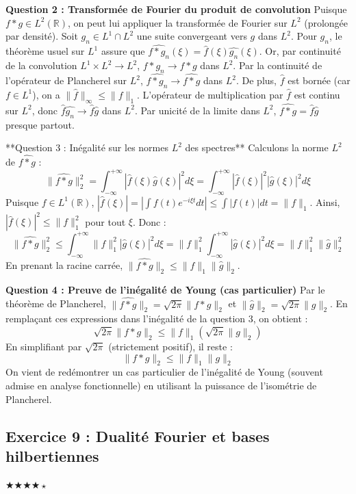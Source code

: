 \documentclass[11pt,a4paper]{article}
\begin{document}
\textbf{Question 2 : Transformée de Fourier du produit de convolution}
Puisque $f * g \in L^2(\mathbb{R})$, on peut lui appliquer la transformée de Fourier sur $L^2$ (prolongée par densité).
Soit $g_n \in L^1 \cap L^2$ une suite convergeant vers $g$ dans $L^2$.
Pour $g_n$, le théorème usuel sur $L^1$ assure que $\widehat{f * g_n}(\xi) = \hat{f}(\xi)\hat{g_n}(\xi)$.
Or, par continuité de la convolution $L^1 \times L^2 \to L^2$, $f * g_n \to f * g$ dans $L^2$.
Par la continuité de l'opérateur de Plancherel sur $L^2$, $\widehat{f * g_n} \to \widehat{f * g}$ dans $L^2$.
De plus, $\hat{f}$ est bornée (car $f \in L^1$), on a $\|\hat{f}\|_{\infty} \le \|f\|_1$.
L'opérateur de multiplication par $\hat{f}$ est continu sur $L^2$, donc $\hat{f} \hat{g_n} \to \hat{f} \hat{g}$ dans $L^2$.
Par unicité de la limite dans $L^2$, $\widehat{f * g} = \hat{f}\hat{g}$ presque partout.

**Question 3 : Inégalité sur les normes $L^2$ des spectres**
Calculons la norme $L^2$ de $\widehat{f * g}$ :
$$ \|\widehat{f * g}\|_2^2 = \int_{-\infty}^{+\infty} |\hat{f}(\xi)\hat{g}(\xi)|^2 d\xi = \int_{-\infty}^{+\infty} |\hat{f}(\xi)|^2 |\hat{g}(\xi)|^2 d\xi $$
Puisque $f \in L^1(\mathbb{R})$, $|\hat{f}(\xi)| = |\int f(t)e^{-i\xi t}dt| \le \int |f(t)|dt = \|f\|_1$.
Ainsi, $|\hat{f}(\xi)|^2 \le \|f\|_1^2$ pour tout $\xi$.
Donc :
$$ \|\widehat{f * g}\|_2^2 \le \int_{-\infty}^{+\infty} \|f\|_1^2 |\hat{g}(\xi)|^2 d\xi = \|f\|_1^2 \int_{-\infty}^{+\infty} |\hat{g}(\xi)|^2 d\xi = \|f\|_1^2 \|\hat{g}\|_2^2 $$
En prenant la racine carrée, $\|\widehat{f * g}\|_2 \le \|f\|_1 \|\hat{g}\|_2$.

\textbf{Question 4 : Preuve de l'inégalité de Young (cas particulier)}
Par le théorème de Plancherel, $\|\widehat{f * g}\|_2 = \sqrt{2\pi} \|f * g\|_2$ et $\|\hat{g}\|_2 = \sqrt{2\pi} \|g\|_2$.
En remplaçant ces expressions dans l'inégalité de la question 3, on obtient :
$$ \sqrt{2\pi} \|f * g\|_2 \le \|f\|_1 (\sqrt{2\pi} \|g\|_2) $$
En simplifiant par $\sqrt{2\pi}$ (strictement positif), il reste :
$$ \|f * g\|_2 \le \|f\|_1 \|g\|_2 $$
On vient de redémontrer un cas particulier de l'inégalité de Young (souvent admise en analyse fonctionnelle) en utilisant la puissance de l'isométrie de Plancherel.


\subsection*{Exercice 9 : Dualité Fourier et bases hilbertiennes}
$\bigstar\bigstar\bigstar\bigstar\star$
\end{document}
